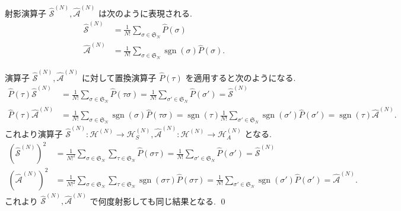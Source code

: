 \documentclass[uplatex,dvipdfmx,a4paper,11pt]{jlreq}
\makeatletter
\DeclareMathOperator{\sgn}{sgn}
\newcommand{\HH}{\mathcal{H}}
\renewcommand{\SS}{\mathfrak{S}}
\renewcommand{\S}{\mathcal{S}}
\newcommand{\A}{\mathcal{A}}
\numberwithin{equation}{section}
\theoremstyle{definition}
\renewenvironment{proof}[1][\proofname]{\par
  \normalfont
  \topsep6\p@\@plus6\p@ \trivlist
  \item[\hskip\labelsep{\bfseries #1}\@addpunct{\bfseries}]\ignorespaces\quad\par
}{%
  \qed\endtrivlist\@endpefalse
}
\renewcommand\proofname{証明}
\makeatother
\begin{document}
\begin{theorem}[Q21-14(i)(ii)(iii)]
  射影演算子 $\hat{\S}^{(N)}, \hat{\A}^{(N)}$ は次のように表現される.
  \begin{align}
    \hat{\S}^{(N)} & = \frac{1}{N!}\sum_{\sigma\in\SS_N}\hat{P}(\sigma)              \\
    \hat{\A}^{(N)} & = \frac{1}{N!}\sum_{\sigma\in\SS_N}\sgn(\sigma)\hat{P}(\sigma).
  \end{align}
\end{theorem}
\begin{proof}
  演算子 $\hat{\S}^{(N)}, \hat{\A}^{(N)}$ に対して置換演算子 $\hat{P}(\tau)$ を適用すると次のようになる.
  \begin{align}
    \hat{P}(\tau)\hat{\S}^{(N)} & = \frac{1}{N!}\sum_{\sigma\in\SS_N}\hat{P}(\tau\sigma) = \frac{1}{N!}\sum_{\sigma'\in\SS_N}\hat{P}(\sigma') = \hat{\S}^{(N)}                                               \\
    \hat{P}(\tau)\hat{\A}^{(N)} & = \frac{1}{N!}\sum_{\sigma\in\SS_N}\sgn(\sigma)\hat{P}(\tau\sigma) = \sgn(\tau)\frac{1}{N!}\sum_{\sigma'\in\SS_N}\sgn(\sigma')\hat{P}(\sigma') = \sgn(\tau)\hat{\A}^{(N)}.
  \end{align}
  これより演算子 $\hat{\S}^{(N)}: \HH^{(N)}\to\HH_S^{(N)}, \hat{\A}^{(N)}: \HH^{(N)}\to\HH_A^{(N)}$ となる.
  \begin{align}
    (\hat{\S}^{(N)})^2 & = \frac{1}{N!^2}\sum_{\sigma\in\SS_N}\sum_{\tau\in\SS_N}\hat{P}(\sigma\tau) = \frac{1}{N!}\sum_{\sigma'\in\SS_N}\hat{P}(\sigma') = \hat{\S}^{(N)}                               \\
    (\hat{\A}^{(N)})^2 & = \frac{1}{N!^2}\sum_{\sigma\in\SS_N}\sum_{\tau\in\SS_N}\sgn(\sigma\tau)\hat{P}(\sigma\tau) = \frac{1}{N!}\sum_{\sigma'\in\SS_N}\sgn(\sigma')\hat{P}(\sigma') = \hat{\A}^{(N)}.
  \end{align}
  これより $\hat{\S}^{(N)}, \hat{\A}^{(N)}$ で何度射影しても同じ結果となる.
\end{proof}
\end{document}
